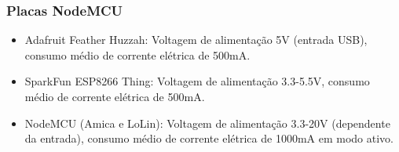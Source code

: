 \documentclass{beamer}
\begin{document}

% 






\begin{frame}
\frametitle{Placas NodeMCU}
\begin{minipage}{\textwidth}
	
	\begin{itemize}
		\item Adafruit Feather Huzzah:  Voltagem de alimentação 5V (entrada USB), consumo médio de corrente elétrica de 500mA.\cite{adafruit-feather}
		
		\item SparkFun ESP8266 Thing: Voltagem de alimentação 3.3-5.5V, consumo médio de corrente elétrica de 500mA.\cite{sparkfunthing}
		
		\item NodeMCU (Amica e LoLin): Voltagem de alimentação 3.3-20V (dependente da entrada), consumo médio de corrente elétrica de 1000mA em modo ativo.\cite{nodemcu_amica_datasheet}
	\end{itemize}
	
	


\end{minipage}
\end{frame}
\end{document}
